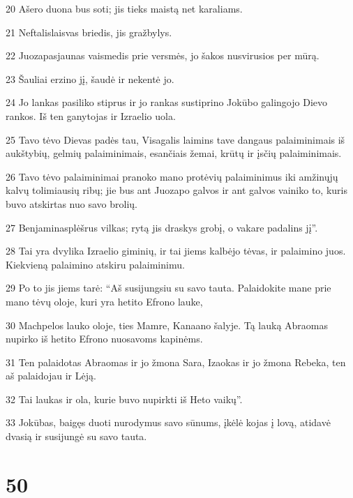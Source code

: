\par 20 Ašero duona bus soti; jis tieks maistą net karaliams. 
\par 21 Neftalis­laisvas briedis, jis gražbylys. 
\par 22 Juozapas­jaunas vaismedis prie versmės, jo šakos nusvirusios per mūrą. 
\par 23 Šauliai erzino jį, šaudė ir nekentė jo. 
\par 24 Jo lankas pasiliko stiprus ir jo rankas sustiprino Jokūbo galingojo Dievo rankos. Iš ten ganytojas ir Izraelio uola. 
\par 25 Tavo tėvo Dievas padės tau, Visagalis laimins tave dangaus palaiminimais iš aukštybių, gelmių palaiminimais, esančiais žemai, krūtų ir įsčių palaiminimais. 
\par 26 Tavo tėvo palaiminimai pranoko mano protėvių palaiminimus iki amžinųjų kalvų tolimiausių ribų; jie bus ant Juozapo galvos ir ant galvos vainiko to, kuris buvo atskirtas nuo savo brolių. 
\par 27 Benjaminas­plėšrus vilkas; rytą jis draskys grobį, o vakare padalins jį”. 
\par 28 Tai yra dvylika Izraelio giminių, ir tai jiems kalbėjo tėvas, ir palaimino juos. Kiekvieną palaimino atskiru palaiminimu. 
\par 29 Po to jis jiems tarė: “Aš susijungsiu su savo tauta. Palaidokite mane prie mano tėvų oloje, kuri yra hetito Efrono lauke, 
\par 30 Machpelos lauko oloje, ties Mamre, Kanaano šalyje. Tą lauką Abraomas nupirko iš hetito Efrono nuosavoms kapinėms. 
\par 31 Ten palaidotas Abraomas ir jo žmona Sara, Izaokas ir jo žmona Rebeka, ten aš palaidojau ir Lėją. 
\par 32 Tai laukas ir ola, kurie buvo nupirkti iš Heto vaikų”. 
\par 33 Jokūbas, baigęs duoti nurodymus savo sūnums, įkėlė kojas į lovą, atidavė dvasią ir susijungė su savo tauta.



\chapter{50}

